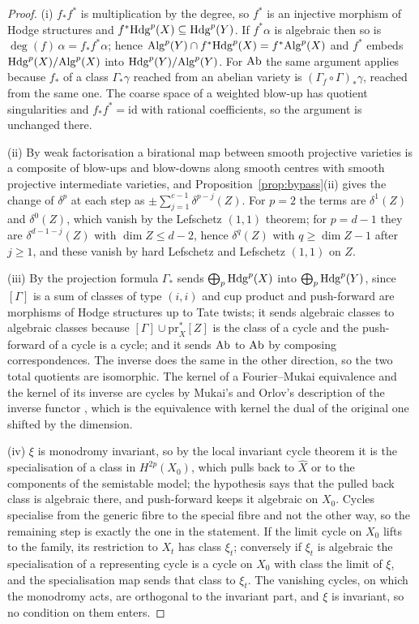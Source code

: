 \begin{proof}
(i) $f_{*}f^{*}$ is multiplication by the degree, so $f^{*}$ is an injective morphism of Hodge structures and $f^{*}\mathrm{Hdg}^{p}(X)\subseteq\mathrm{Hdg}^{p}(Y)$. If $f^{*}\alpha$ is algebraic then so is $\deg(f)\,\alpha=f_{*}f^{*}\alpha$; hence $\mathrm{Alg}^{p}(Y)\cap f^{*}\mathrm{Hdg}^{p}(X)=f^{*}\mathrm{Alg}^{p}(X)$ and $f^{*}$ embeds $\mathrm{Hdg}^{p}(X)/\mathrm{Alg}^{p}(X)$ into $\mathrm{Hdg}^{p}(Y)/\mathrm{Alg}^{p}(Y)$. For $\mathrm{Ab}$ the same argument applies because $f_{*}$ of a class $\Gamma_{*}\gamma$ reached from an abelian variety is $(\Gamma_{f}\circ\Gamma)_{*}\gamma$, reached from the same one. The coarse space of a weighted blow-up has quotient singularities and $f_{*}f^{*}=\mathrm{id}$ with rational coefficients, so the argument is unchanged there.

(ii) By weak factorisation \cite{AKMW02} a birational map between smooth projective varieties is a composite of blow-ups and blow-downs along smooth centres with smooth projective intermediate varieties, and Proposition~\ref{prop:bypass}(ii) gives the change of $\delta^{p}$ at each step as $\pm\sum_{j=1}^{c-1}\delta^{p-j}(Z)$. For $p=2$ the terms are $\delta^{1}(Z)$ and $\delta^{0}(Z)$, which vanish by the Lefschetz $(1,1)$ theorem; for $p=d-1$ they are $\delta^{d-1-j}(Z)$ with $\dim Z\le d-2$, hence $\delta^{q}(Z)$ with $q\ge\dim Z-1$ after $j\ge1$, and these vanish by hard Lefschetz and Lefschetz $(1,1)$ on $Z$.

(iii) By the projection formula $\Gamma_{*}$ sends $\bigoplus_{p}\mathrm{Hdg}^{p}(X)$ into $\bigoplus_{p}\mathrm{Hdg}^{p}(Y)$, since $[\Gamma]$ is a sum of classes of type $(i,i)$ and cup product and push-forward are morphisms of Hodge structures up to Tate twists; it sends algebraic classes to algebraic classes because $[\Gamma]\cup\mathrm{pr}_{X}^{*}[Z]$ is the class of a cycle and the push-forward of a cycle is a cycle; and it sends $\mathrm{Ab}$ to $\mathrm{Ab}$ by composing correspondences. The inverse does the same in the other direction, so the two total quotients are isomorphic. The kernel of a Fourier--Mukai equivalence and the kernel of its inverse are cycles by Mukai's and Orlov's description of the inverse functor \cite{Orl97}, which is the equivalence with kernel the dual of the original one shifted by the dimension.

(iv) $\xi$ is monodromy invariant, so by the local invariant cycle theorem it is the specialisation of a class in $H^{2p}(X_{0})$, which pulls back to $\hat X$ or to the components of the semistable model; the hypothesis says that the pulled back class is algebraic there, and push-forward keeps it algebraic on $X_{0}$. Cycles specialise from the generic fibre to the special fibre \cite[Ch.~20]{Ful98} and not the other way, so the remaining step is exactly the one in the statement. If the limit cycle on $X_{0}$ lifts to the family, its restriction to $X_{t}$ has class $\xi_{t}$; conversely if $\xi_{t}$ is algebraic the specialisation of a representing cycle is a cycle on $X_{0}$ with class the limit of $\xi$, and the specialisation map sends that class to $\xi_{t}$. The vanishing cycles, on which the monodromy acts, are orthogonal to the invariant part, and $\xi$ is invariant, so no condition on them enters.
\end{proof}

